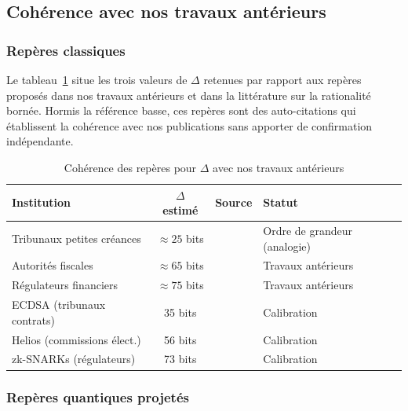 \subsection{Coh\'erence avec nos travaux ant\'erieurs}
\label{sec:validation_croisee_benchmarks}
\begin{sloppypar}

\subsubsection{Rep\`eres classiques}
\label{subsec:benchmarks_classiques}

Le tableau~\ref{tab:benchmarks_classiques} situe les trois valeurs de $\Delta$
retenues par rapport aux rep\`eres propos\'es dans nos travaux ant\'erieurs et
dans la litt\'erature sur la rationalit\'e born\'ee. Hormis la r\'ef\'erence basse,
ces rep\`eres sont des auto-citations qui \'etablissent la coh\'erence avec nos
publications sans apporter de confirmation ind\'ependante.

\begin{table}[htbp]
\centering
\caption{Coh\'erence des rep\`eres pour $\Delta$ avec nos travaux ant\'erieurs}
\label{tab:benchmarks_classiques}
\begin{tabular}{@{}lcll@{}}
\toprule
\textbf{Institution} & $\Delta$ \textbf{estim\'e} &
\textbf{Source} & \textbf{Statut} \\
\midrule
Tribunaux petites cr\'eances & $\approx 25$ bits & \cite{Simon82} & Ordre de grandeur (analogie) \\
Autorit\'es fiscales & $\approx 65$ bits & \cite{MINKA2026CRO} & Travaux ant\'erieurs \\
R\'egulateurs financiers & $\approx 75$ bits & \cite{MINKA2026CRO} & Travaux ant\'erieurs \\
\midrule
ECDSA (tribunaux contrats) & 35 bits & \cite{MINKA2026SOTP} & Calibration \\
Helios (commissions \'elect.) & 56 bits & \cite{MINKA2026SOTP} & Calibration \\
zk-SNARKs (r\'egulateurs) & 73 bits & \cite{MINKA2026SOTP} & Calibration \\
\bottomrule
\end{tabular}
\end{table}

\subsubsection{Rep\`eres quantiques projet\'es}
\label{subsec:benchmarks_quantiques}


\end{sloppypar}
